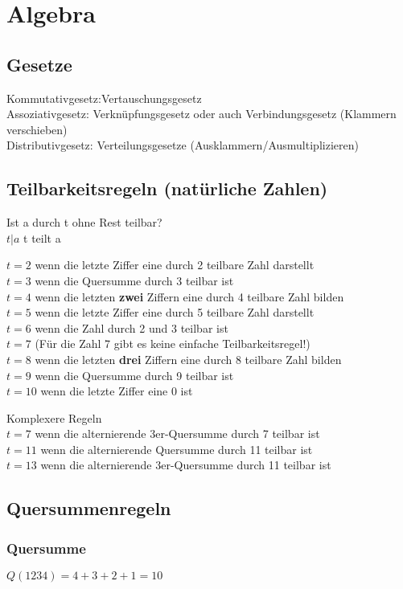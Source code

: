 \section{Algebra}
\subsection{Gesetze}
Kommutativgesetz:Vertauschungsgesetz \\
Assoziativgesetz: Verknüpfungsgesetz oder auch Verbindungsgesetz (Klammern verschieben) \\
Distributivgesetz: Verteilungsgesetze (Ausklammern/Ausmultiplizieren)


\subsection{Teilbarkeitsregeln (natürliche Zahlen)}
Ist a durch t ohne Rest teilbar?\\
$t|a$ t teilt a 


$t=2$ wenn die letzte Ziffer eine durch 2 teilbare Zahl darstellt\\
$t=3$ wenn die Quersumme durch 3 teilbar ist\\
$t=4$ wenn die letzten \textbf{zwei} Ziffern eine durch 4 teilbare Zahl bilden\\
$t=5$ wenn die letzte Ziffer eine durch 5 teilbare Zahl darstellt\\
$t=6$ wenn die Zahl durch 2 und 3 teilbar ist\\
$t=7$ (Für die Zahl 7 gibt es keine einfache Teilbarkeitsregel!)\\
$t=8$ wenn die letzten \textbf{drei} Ziffern eine durch 8 teilbare Zahl bilden\\
$t=9$ wenn die Quersumme durch 9 teilbar ist\\
$t=10$ wenn die letzte Ziffer eine 0 ist

Komplexere Regeln \\
$t=7$ wenn die alternierende 3er-Quersumme durch 7 teilbar ist\\
$t=11$ wenn die alternierende Quersumme durch 11 teilbar ist\\
$t=13$ wenn die alternierende 3er-Quersumme durch 11 teilbar ist


\subsection{Quersummenregeln}
\subsubsection{Quersumme}
$Q(1234)=4+3+2+1=10$

